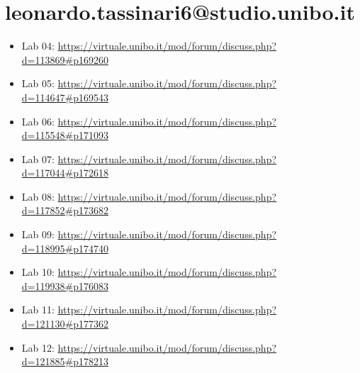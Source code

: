 \documentclass[a4paper,12pt]{report}
\begin{document}
\section*{leonardo.tassinari6@studio.unibo.it}

\begin{itemize}
	\item Lab 04: \url{https://virtuale.unibo.it/mod/forum/discuss.php?d=113869#p169260}
	\item Lab 05: \url{https://virtuale.unibo.it/mod/forum/discuss.php?d=114647#p169543}
	\item Lab 06: \url{https://virtuale.unibo.it/mod/forum/discuss.php?d=115548#p171093}
	\item Lab 07: \url{https://virtuale.unibo.it/mod/forum/discuss.php?d=117044#p172618}
	\item Lab 08: \url{https://virtuale.unibo.it/mod/forum/discuss.php?d=117852#p173682}
	\item Lab 09: \url{https://virtuale.unibo.it/mod/forum/discuss.php?d=118995#p174740}
	\item Lab 10: \url{https://virtuale.unibo.it/mod/forum/discuss.php?d=119938#p176083}
	\item Lab 11: \url{https://virtuale.unibo.it/mod/forum/discuss.php?d=121130#p177362}
	\item Lab 12: \url{https://virtuale.unibo.it/mod/forum/discuss.php?d=121885#p178213}


\end{itemize}



\end{document}
